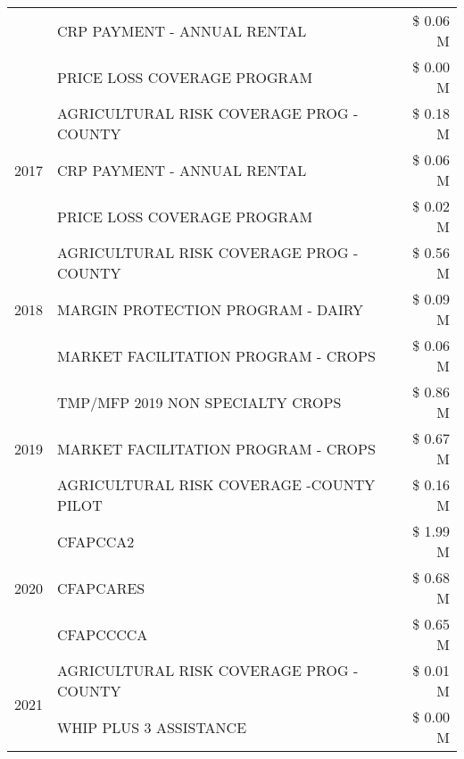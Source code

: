 \begin{tabular}{llr}
 & CRP PAYMENT - ANNUAL RENTAL & \$ 0.06 M \\
 & PRICE LOSS COVERAGE PROGRAM & \$ 0.00 M \\
\cline{1-3}
\multirow[t]{3}{*}{2017} & AGRICULTURAL RISK COVERAGE PROG - COUNTY & \$ 0.18 M \\
 & CRP PAYMENT - ANNUAL RENTAL & \$ 0.06 M \\
 & PRICE LOSS COVERAGE PROGRAM & \$ 0.02 M \\
\cline{1-3}
\multirow[t]{3}{*}{2018} & AGRICULTURAL RISK COVERAGE PROG - COUNTY & \$ 0.56 M \\
 & MARGIN PROTECTION PROGRAM - DAIRY & \$ 0.09 M \\
 & MARKET FACILITATION PROGRAM - CROPS & \$ 0.06 M \\
\cline{1-3}
\multirow[t]{3}{*}{2019} & TMP/MFP 2019 NON SPECIALTY CROPS & \$ 0.86 M \\
 & MARKET FACILITATION PROGRAM - CROPS & \$ 0.67 M \\
 & AGRICULTURAL RISK COVERAGE -COUNTY PILOT & \$ 0.16 M \\
\cline{1-3}
\multirow[t]{3}{*}{2020} & CFAPCCA2 & \$ 1.99 M \\
 & CFAPCARES & \$ 0.68 M \\
 & CFAPCCCCA & \$ 0.65 M \\
\cline{1-3}
\multirow[t]{2}{*}{2021} & AGRICULTURAL RISK COVERAGE PROG - COUNTY & \$ 0.01 M \\
 & WHIP PLUS 3 ASSISTANCE & \$ 0.00 M \\
\cline{1-3}
\bottomrule
\end{tabular}

